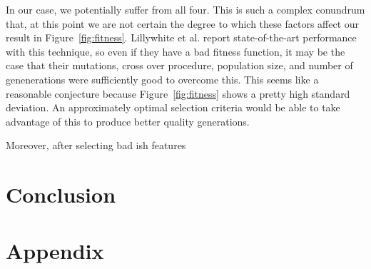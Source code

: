 \documentclass[conference]{IEEEtran}
\begin{document}
In our case, we potentially suffer from all four. This is such a complex conundrum that, at this point we are not certain the degree to which these factors affect our result in Figure~\ref{fig:fitness}. Lillywhite et al. report state-of-the-art performance with this technique, so even if they have a bad fitness function, it may be the case that their mutations, cross over procedure, population size, and number of genenerations were sufficiently good to overcome this. This seems like a reasonable conjecture because Figure~\ref{fig:fitness} shows a pretty high standard deviation. An approximately optimal selection criteria would be able to take advantage of this to produce better quality generations. 

Moreover, after selecting bad ish features
\subsection{}

\section{Conclusion}
\section{Appendix}
%


\end{document}
